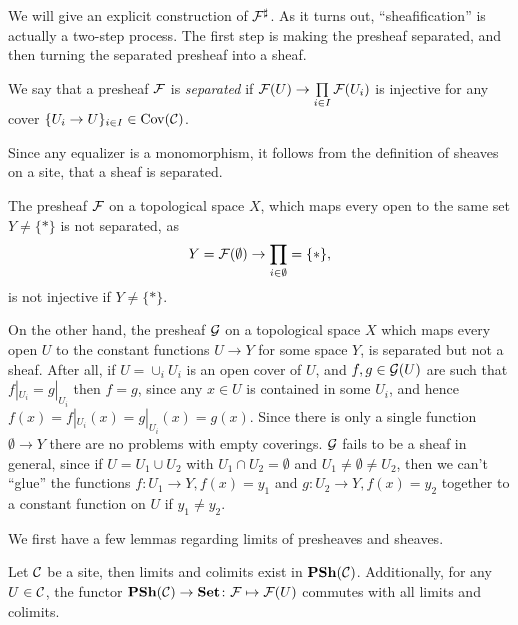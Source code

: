 \documentclass{article}
\DeclareMathOperator{\Cov}{Cov}
\begin{document}
We will give an explicit construction of $\mathcal{F}^\sharp$.
As it turns out, ``sheafification'' is actually a two-step process.
The first step is making the presheaf separated, and then turning
the separated presheaf into a sheaf.
\begin{definition}
    We say that a presheaf $\mathcal{F}$ is \emph{separated} if
    $\mathcal{F}(U) \to \prod\limits_{i\in I} \mathcal{F}(U_i)$ is injective
    for any cover $\{U_i \to U\}_{i\in I} \in \Cov(\mcC)$.
\end{definition}
\begin{remark}
    Since any equalizer is a monomorphism, it follows from the definition
    of sheaves on a site, that a sheaf is separated.
\end{remark}
\begin{example}
    \label{exmp:bad_presheaves}
    The presheaf $\mathcal{F}$ on a topological space $X$, which maps every
    open to the same set $Y \neq \{*\}$ is not separated, as
    \begin{equation*}
        Y = \mathcal{F}(\emptyset) \to \prod_{i \in \emptyset} = \{*\},
    \end{equation*}
    is not injective if $Y \neq \{*\}$.

    On the other hand, the presheaf $\mathcal{G}$ on a topological space
    $X$ which maps every open $U$ to the constant functions $U \to Y$
    for some space $Y$, is separated but not a sheaf. After all,
    if $U = \cup_i U_i$ is an open cover of $U$, and $f,g \in \mathcal{G}(U)$
    are such that $f|_{U_i} = g|_{U_i}$ then $f = g$, since any $x\in U$
    is contained in some $U_i$, and hence $f(x) = f|_{U_i}(x) = g|_{U_i}(x) = g(x)$.
    Since there is only a single function $\emptyset \to Y$ there are no
    problems with empty coverings. $\mathcal{G}$ fails to be a sheaf
    in general, since if $U = U_1 \cup U_2$ with $U_1 \cap U_2 = \emptyset$
    and $U_1 \neq \emptyset \neq U_2$, then we can't ``glue'' the functions
    $f \colon U_1 \to Y, f(x) = y_1$ and $g\colon U_2 \to Y, f(x) =y_2$
    together to a constant function on $U$ if $y_1 \neq y_2$.
\end{example}
We first have a few lemmas regarding limits of presheaves and sheaves.
\begin{lemma}
    \label{lem:lims_colims_presheaves}
    Let $\mathcal{C}$ be a site, then limits and
    colimits exist in $\operatorname{\mathbf{PSh}}(\mathcal{C})$. Additionally, for any $U\in \mathcal{C}$,
    the functor $\operatorname{\mathbf{PSh}}(\mathcal{C}) \to \operatorname{\mathbf{Set}} \colon \mathcal{F} \mapsto \mathcal{F}(U)$
    commutes with all limits and colimits.
\end{lemma}
\end{document}
